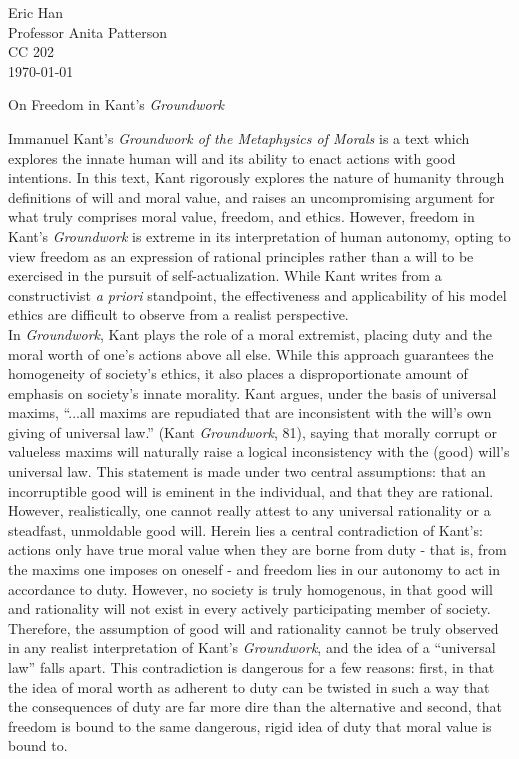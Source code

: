\documentclass[12pt]{article}
\begin{document}
\begin{flushleft}

Eric Han\\
Professor Anita Patterson\\
CC 202\\
\today \\


\begin{center}
On Freedom in Kant's \textit{Groundwork}
\end{center}


\setlength{\parindent}{0.5in}

Immanuel Kant's \textit{Groundwork of the Metaphysics of Morals} is a text which explores the innate human will and its ability to enact actions with good intentions. In this text, Kant rigorously explores the nature of humanity through definitions of will and moral value, and raises an uncompromising argument for what truly comprises moral value, freedom, and ethics. However, freedom in Kant's \textit{Groundwork} is extreme in its interpretation of human autonomy, opting to view freedom as an expression of rational principles rather than a will to be exercised in the pursuit of self-actualization. While Kant writes from a constructivist \textit{a priori} standpoint, the effectiveness and applicability of his model ethics are difficult to observe from a realist perspective.\\
In \textit{Groundwork}, Kant plays the role of a moral extremist, placing duty and the moral worth of one's actions above all else. While this approach guarantees the homogeneity of society's ethics, it also places a disproportionate amount of emphasis on society's innate morality. Kant argues, under the basis of universal maxims, ``...all maxims are repudiated that are inconsistent with the will's own giving of universal law.'' (Kant \textit{Groundwork}, 81), saying that morally corrupt or valueless maxims will naturally raise a logical inconsistency with the (good) will's universal law. This statement is made under two central assumptions: that an incorruptible good will is eminent in the individual, and that they are rational. However, realistically, one cannot really attest to any universal rationality or a steadfast, unmoldable good will. Herein lies a central contradiction of Kant's: actions only have true moral value when they are borne from duty - that is, from the maxims one imposes on oneself - and freedom lies in our autonomy to act in accordance to duty. However, no society is truly homogenous, in that good will and rationality will not exist in every actively participating member of society. Therefore, the assumption of good will and rationality cannot be truly observed in any realist interpretation of Kant's \textit{Groundwork}, and the idea of a ``universal law'' falls apart. This contradiction is dangerous for a few reasons: first, in that the idea of moral worth as adherent to duty can be twisted in such a way that the consequences of duty are far more dire than the alternative and second, that freedom is bound to the same dangerous, rigid idea of duty that moral value is bound to. \\

\end{flushleft}
\end{document}
